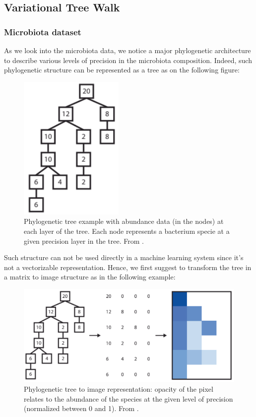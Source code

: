 \subsection{Variational Tree Walk}

\subsubsection{Microbiota dataset}

As we look into the microbiota data, we notice a major phylogenetic architecture to describe various levels of precision in the microbiota composition.
Indeed, such phylogenetic structure can be represented as a tree as on the following figure:
\begin{figure}[H]
    \center
    \includegraphics[scale=1]{images/abundance_tree_phylogenetic}
    \caption{Phylogenetic tree example with abundance data (in the nodes) at each layer of the tree.
    Each node represents a bacterium specie at a given precision layer in the tree. From \cite{microbiome_deeplearning_research}.}
    \label{fig:phylogenetic_tree}
\end{figure}

Such structure can not be used directly in a machine learning system since it's not a vectorizable representation.
Hence, we first suggest to transform the tree in a matrix to image structure as in the following example:
\begin{figure}[H]
    \center
    \includegraphics[scale=1]{images/tree_to_image}
    \caption{Phylogenetic tree to image representation:
    opacity of the pixel relates to the abundance of the species at the given level of precision (normalized between 0 and 1).
    From \cite{microbiome_deeplearning_research}.}
    \label{fig:phylogenetic_tree_to_img}
\end{figure}

